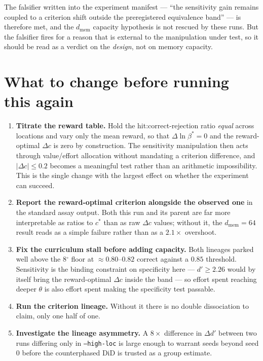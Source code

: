 \documentclass[11pt]{article}
\newcommand{\dprime}{d'}
\newcommand{\dd}{\Delta d'}
\newcommand{\dc}{\Delta c}
\newcommand{\dg}{\ensuremath{^\circ}}
\begin{document}
The falsifier written into the experiment manifest --- ``the sensitivity gain remains
coupled to a criterion shift outside the preregistered equivalence band'' --- is
therefore met, and the $d_{\mathrm{mem}}$ capacity hypothesis is not rescued by these
runs. But the falsifier fires for a reason that is external to the manipulation under
test, so it should be read as a verdict on the \emph{design}, not on memory capacity.

\section{What to change before running this again}

\begin{enumerate}[leftmargin=1.5em,itemsep=3pt]
\item \textbf{Titrate the reward table.} Hold the hit:correct-rejection ratio
\emph{equal} across locations and vary only the mean reward, so that
$\Delta \ln \beta^{\ast} = 0$ and the reward-optimal $\dc$ is zero by construction. The
sensitivity manipulation then acts through value/effort allocation without mandating a
criterion difference, and $|\dc| \le 0.2$ becomes a meaningful test rather than an
arithmetic impossibility. This is the single change with the largest effect on whether
the experiment can succeed.
\item \textbf{Report the reward-optimal criterion alongside the observed one} in the
standard assay output. Both this run and its parent are far more interpretable as
ratios to $c^{\ast}$ than as raw $\dc$ values; without it, the $d_{\mathrm{mem}}{=}64$
result reads as a simple failure rather than as a $2.1\times$ overshoot.
\item \textbf{Fix the curriculum stall before adding capacity.} Both lineages parked
well above the $8\dg$ floor at $\approx 0.80$--$0.82$ correct against a $0.85$ threshold.
Sensitivity is the binding constraint on specificity here --- $\dprime \ge 2.26$ would by
itself bring the reward-optimal $\dc$ inside the band --- so effort spent reaching deeper
$\theta$ is also effort spent making the specificity test passable.
\item \textbf{Run the criterion lineage.} Without it there is no double dissociation to
claim, only one half of one.
\item \textbf{Investigate the lineage asymmetry.} A $8\times$ difference in $\dd$ between
two runs differing only in \texttt{--high-loc} is large enough to warrant seeds beyond
seed 0 before the counterphased DiD is trusted as a group estimate.
\end{enumerate}
\end{document}
